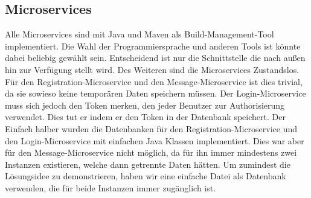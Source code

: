 \subsection{Microservices}
Alle Microservices sind mit Java und Maven als Build-Management-Tool implementiert. Die Wahl der Programmiersprache und anderen Tools ist könnte dabei beliebig gewählt sein. Entscheidend ist nur die Schnittstelle die nach außen hin zur Verfügung stellt wird. Des Weiteren sind die Microservices Zustandslos. Für den Registration-Microservice und den Message-Microservice ist dies trivial, da sie sowieso keine temporären Daten speichern müssen. Der Login-Microservice muss sich jedoch den Token merken, den jeder Benutzer zur Authorisierung verwendet. Dies tut er indem er den Token in der Datenbank speichert.
Der Einfach halber wurden die Datenbanken für den Registration-Microservice und den Login-Microservice mit einfachen Java Klassen implementiert. Dies war aber für den Message-Microservice nicht möglich, da für ihn immer mindestens zwei Instanzen existieren, welche dann getrennte Daten hätten. Um zumindest die Lösungsidee zu demonstrieren, haben wir eine einfache Datei als Datenbank verwenden, die für beide Instanzen immer zugänglich ist.